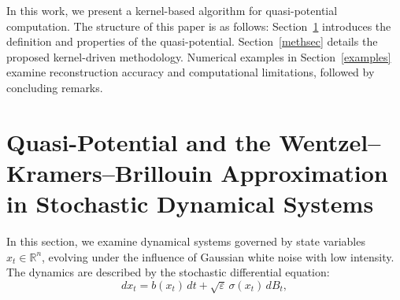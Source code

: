 \documentclass[11pt]{article}
\theoremstyle{plain}      %
\theoremstyle{definition} %
\begin{document}
In this work, we present a kernel-based algorithm for quasi-potential computation. The structure of this paper is as follows: Section~\ref{qpsec} introduces the definition and properties of the quasi-potential. Section~\ref{methsec} details the proposed kernel-driven methodology. Numerical examples in Section~\ref{examples} examine reconstruction accuracy and computational limitations, followed by concluding remarks.







 


 

\setcounter{equation}{0}
\section{Quasi-Potential and the Wentzel--Kramers--Brillouin Approximation in Stochastic Dynamical Systems} \label{qpsec}

In this section, we examine dynamical systems governed by state variables \( x_t \in \mathbb{R}^n \), evolving under the influence of Gaussian white noise with low intensity. The dynamics are described by the stochastic differential equation:
\begin{equation}
\label{sde}
dx_t = b(x_t)\,dt + \sqrt{\varepsilon}\,\sigma(x_t)\,dB_t,
\end{equation}
\end{document}
